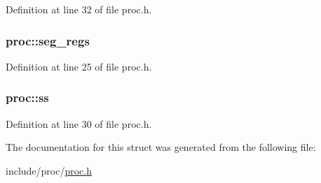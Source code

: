 \-Definition at line 32 of file proc.\-h.

\hypertarget{structproc_aee00499def5c013e7498cbe44b14cee1}{
\subsubsection[{seg\-\_\-regs}]{ {\bf proc\-::seg\-\_\-regs}}}\label{structproc_aee00499def5c013e7498cbe44b14cee1}


\-Definition at line 25 of file proc.\-h.

\hypertarget{structproc_aa7c1976cb03e0295ef1dac2ddb52c900}{
\subsubsection[{ss}]{ {\bf proc\-::ss}}}\label{structproc_aa7c1976cb03e0295ef1dac2ddb52c900}


\-Definition at line 30 of file proc.\-h.



\-The documentation for this struct was generated from the following file\-:\begin{DoxyCompactItemize}
\item 
include/proc/\hyperlink{proc_8h}{proc.\-h}\end{DoxyCompactItemize}
